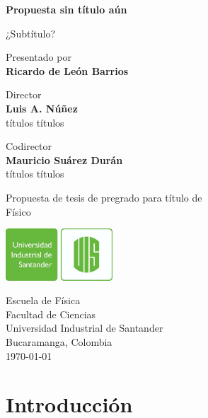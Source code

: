 \documentclass{report}
\begin{document}
\begin{titlepage}
   \begin{center}
       \vspace*{1cm}
       
       
       \LARGE
       \textbf{Propuesta sin título aún}
       
       \large
       \vspace{0.5cm}
        ¿Subtítulo?
 
       \vspace{1.5cm}
 
       Presentado por\\
       \textbf{Ricardo de León Barrios}
       
       \vspace{1cm}
       Director\\
       \textbf{Luis A. Núñez}\\
       títulos títulos
       
       \vspace{1cm}
       Codirector\\
       \textbf{Mauricio Suárez Durán}\\
       títulos títulos
 
       \vfill
       
       \normalsize
       Propuesta de tesis de pregrado para título de \\
       Físico
 
       \vspace{0.8cm}
 
       \includegraphics[width=0.3\textwidth]{logo/logoUIS.png}
 
       
       Escuela de Física\\
       Facultad de Ciencias\\
       Universidad Industrial de Santander\\
       Bucaramanga, Colombia\\
       \today
 
   \end{center}
\end{titlepage}

\chapter*{Introducción}
\end{document}
